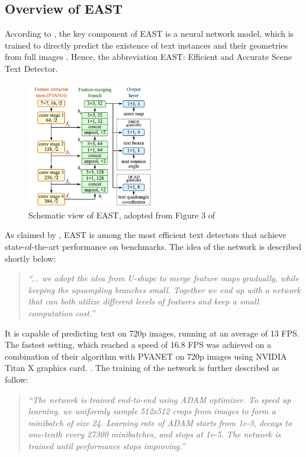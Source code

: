 \documentclass[10pt, a4paper]{article}
\begin{document}
\subsection{Overview of EAST} %
\label{sub:overvieweast}
According to \cite{EastZhouEtAl}, the key component of EAST is a neural network model, which is trained to directly predict the existence of text instances and their geometries from full images \citep{EastZhouEtAl}.
Hence, the abbreviation EAST: Efficient and Accurate Scene Text Detector.
\begin{figure}[hbt!]
	\centering
	\includegraphics[width=0.5\textwidth]{img/eaststructure.png}
	\caption{Schematic view of EAST, adopted from Figure 3 of~\protect\cite{EastZhouEtAl}}
	\label{fig:east1}
\end{figure}

As claimed by \cite{EastZhouEtAl}, EAST is among the most efficient text detectors that achieve state-of-the-art performance on benchmarks.
The idea of the network is described shortly below:
\begin{quotation}
	\emph{``... we adopt the idea from U-shape \citep{unet}
	to merge feature maps gradually, while keeping the upsampling branches small. Together we end up with a network that can both utilize different levels of features and
	keep a small computation cost.''} 
	\citep{EastZhouEtAl} 
\end{quotation}
It is capable of predicting text on 720p images, running at an average of 13 FPS. The fastest setting, which reached a speed of 16.8 FPS was achieved on a combination of their algorithm with PVANET on 720p images using NVIDIA Titan X graphics card. \citep{EastZhouEtAl}.
The training of the network is further described as follow:
\begin{quotation}
	\emph{``The network is trained end-to-end using ADAM \citep{adam}
	optimizer. To speed up learning, we uniformly sample
	512x512 crops from images to form a minibatch of size
	24. Learning rate of ADAM starts from 1e-3, decays to
	one-tenth every 27300 minibatches, and stops at 1e-5. The
	network is trained until performance stops improving.''} 
	\citep{EastZhouEtAl} 
\end{quotation}
\end{document}
